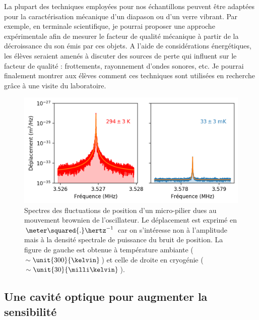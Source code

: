 \documentclass[12pt,a4paper]{article}
\newenvironment{mep}{%
\addcontentsline{ldf}{figure}{0}%
\begin{mep_env}
\small}
{\end{mep_env}}
\begin{document}
\begin{mep}
La plupart des techniques employées pour nos échantillons peuvent être adaptées pour la caractérisation mécanique d'un diapason ou d'un verre vibrant.
Par exemple, en terminale scientifique, je pourrai proposer une approche expérimentale afin de mesurer le facteur de qualité mécanique à partir de la décroissance du son émis par ces objets.
A l'aide de considérations énergétiques, les élèves seraient amenés à discuter des sources de perte qui influent sur le facteur de qualité : frottements, rayonnement d'ondes sonores, etc.
Je pourrai finalement montrer aux élèves comment ces techniques sont utilisées en recherche grâce à une visite du laboratoire.
\end{mep}

\begin{figure}
\center
\includegraphics[scale=0.75]{figures/thermal_peak_def_filled.png}
\caption{Spectres des fluctuations de position d'un micro-pilier dues au mouvement brownien de l'oscillateur.
Le déplacement est exprimé en $\meter\squared{.}\hertz^{-1}$ car on s'intéresse non à l'amplitude mais à la densité spectrale de puissance du bruit de position.
La figure de gauche est obtenue à température ambiante ($\sim\unit{300}{\kelvin}$) et celle de droite en cryogénie ($\sim\unit{30}{\milli\kelvin}$).}
\label{fig:thermal_noise}
\end{figure}

\subsection{Une cavité optique pour augmenter la sensibilité}
\label{sec:cavity}
\end{document}
